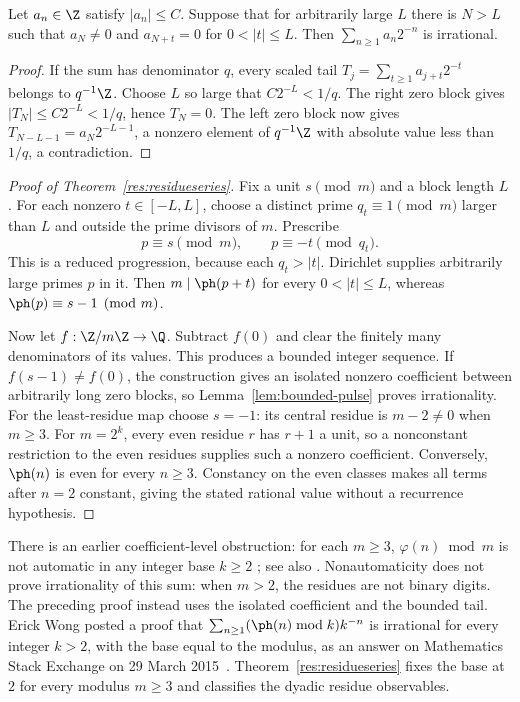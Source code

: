 \documentclass[11pt]{article}
\begin{document}
\begin{lemma}\label{lem:bounded-pulse}
Let $a_n\in\Z$ satisfy $|a_n|\le C$. Suppose that for arbitrarily large $L$
there is $N>L$ such that $a_N\ne0$ and
$a_{N+t}=0$ for $0<|t|\le L$. Then $\sum_{n\ge1}a_n2^{-n}$ is irrational.
\end{lemma}
\begin{proof}
If the sum has denominator $q$, every scaled tail
$T_j=\sum_{t\ge1}a_{j+t}2^{-t}$ belongs to $q^{-1}\Z$.
Choose $L$ so large that $C2^{-L}<1/q$.
The right zero block gives $|T_N|\le C2^{-L}<1/q$, hence $T_N=0$.
The left zero block now gives
$T_{N-L-1}=a_N2^{-L-1}$, a nonzero element of $q^{-1}\Z$ with absolute
value less than $1/q$, a contradiction.
\end{proof}

\begin{proof}[Proof of Theorem~\ref{res:residueseries}]
Fix a unit $s\pmod m$ and a block length $L$. For each nonzero
$t\in[-L,L]$, choose a distinct prime $q_t\equiv1\pmod m$ larger than $L$
and outside the prime divisors of $m$. Prescribe
\[
 p\equiv s\pmod m,\qquad p\equiv-t\pmod{q_t}.
\]
This is a reduced progression, because each $q_t>|t|$. Dirichlet supplies
arbitrarily large primes $p$ in it. Then $m\mid\ph(p+t)$ for every
$0<|t|\le L$, whereas $\ph(p)\equiv s-1\pmod m$.

Now let $f:\Z/m\Z\to\Q$. Subtract $f(0)$ and clear the finitely many
denominators of its values. This produces a bounded integer sequence.
If $f(s-1)\ne f(0)$, the construction gives an isolated nonzero coefficient
between arbitrarily long zero blocks, so Lemma~\ref{lem:bounded-pulse}
proves irrationality. For the
least-residue map choose $s=-1$: its central residue is $m-2\ne0$ when
$m\ge3$. For $m=2^k$, every even residue $r$ has $r+1$ a unit, so a
nonconstant restriction to the even residues supplies such a nonzero coefficient.
Conversely, $\ph(n)$ is even for every $n\ge3$. Constancy on the even
classes makes all terms after $n=2$ constant, giving the stated rational
value without a recurrence hypothesis.
\end{proof}
There is an earlier coefficient-level obstruction: for each $m\ge3$,
$\varphi(n)\bmod m$ is not automatic in any integer base $k\ge2$
\cite[Cor.~4, p.~654]{yazdani2001}; see also
\cite[Thm.~3 and Ex.~4]{allouche-shallit-yassawi}.
Nonautomaticity does not prove irrationality of this sum: when $m>2$,
the residues are not binary digits. The preceding proof instead uses
the isolated coefficient and the bounded tail.
Erick Wong posted a proof that $\sum_{n\ge1}(\ph(n)\bmod k)k^{-n}$ is
irrational for every integer $k>2$, with the base equal to the modulus, as an
answer on Mathematics Stack Exchange on 29 March 2015~\cite{wong2015}.
Theorem~\ref{res:residueseries} fixes the base at $2$ for every modulus
$m\ge3$ and classifies the dyadic residue observables.
\end{document}
